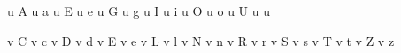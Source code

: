  u A {\Abreve}         u a {\abreve}
 u E {\Ebreve}         u e {\ebreve}
 u G {\Gbreve}         u g {\gbreve}
 u I {\Ibreve}         u i {\ibreve}
 u O {\Obreve}         u o {\obreve}
 u U {\Ubreve}         u u {\ubreve}

 v C {\Ccaron}         v c {\ccaron}
 v D {\Dcaron}         v d {\dcaron}
 v E {\Ecaron}         v e {\ecaron}
 v L {\Lcaron}         v l {\lcaron}
 v N {\Ncaron}         v n {\ncaron}
 v R {\Rcaron}         v r {\rcaron}
 v S {\Scaron}         v s {\scaron}
 v T {\Tcaron}         v t {\tcaron}
 v Z {\Zcaron}         v z {\zcaron}

\stopencoding

\endinput

